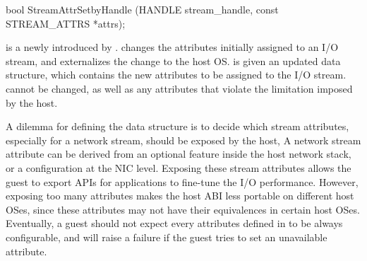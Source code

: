 \begin{paldef}
bool StreamAttrSetbyHandle (HANDLE stream_handle,
                            const STREAM_ATTRS *attrs);
\end{paldef}


 is a \hostapi{} newly introduced by \graphene{}.
 changes the attributes initially assigned to an I/O stream, and externalizes the change to the host OS.
 is given an updated  data structure,
which contains the new attributes to be assigned to the I/O stream.
 cannot be changed, as well as any attributes that violate the limitation imposed by the host.


A dilemma for defining the  data structure is
to decide which stream attributes,
especially for a network stream, should be exposed by the host,
A network stream attribute can be derived from an optional feature inside the host network stack,
or a configuration at the NIC level.
Exposing these stream attributes allows the guest to export APIs for applications
to fine-tune the I/O performance.
However, exposing too many attributes makes the host ABI
less portable on different host OSes, since these attributes may not have their equivalences in certain host OSes.
Eventually, a guest should not expect every attributes defined in  to be always configurable,
and  will raise a failure
if the guest tries to set an unavailable attribute.













